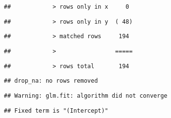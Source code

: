 \documentclass[
]{article}
\begin{document}
\begin{verbatim}
##            > rows only in x     0
\end{verbatim}

\begin{verbatim}
##            > rows only in y  ( 48)
\end{verbatim}

\begin{verbatim}
##            > matched rows     194
\end{verbatim}

\begin{verbatim}
##            >                 =====
\end{verbatim}

\begin{verbatim}
##            > rows total       194
\end{verbatim}

\begin{verbatim}
## drop_na: no rows removed
\end{verbatim}

\begin{verbatim}
## Warning: glm.fit: algorithm did not converge
\end{verbatim}

\begin{verbatim}
## Fixed term is "(Intercept)"
\end{verbatim}
\end{document}
